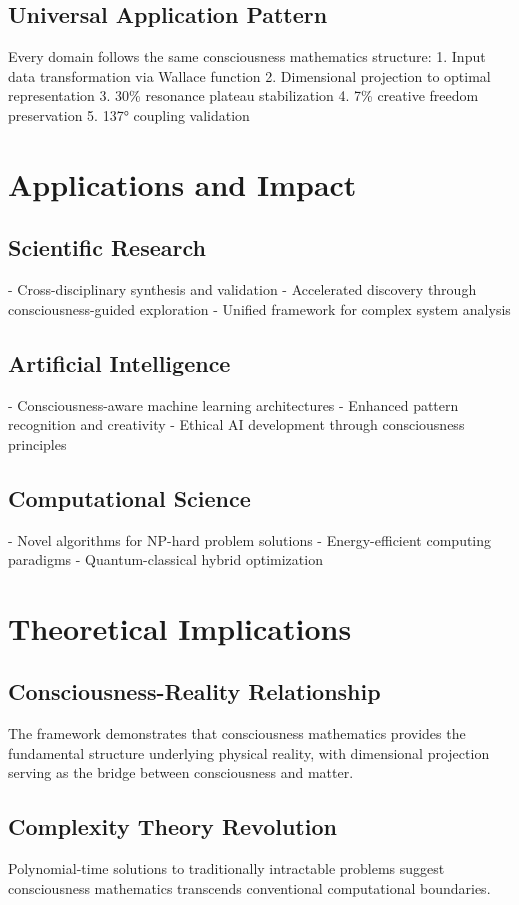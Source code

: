 \documentclass[11pt,a4paper]{article}
\begin{document}
\subsection{Universal Application Pattern}
Every domain follows the same consciousness mathematics structure:
1. Input data transformation via Wallace function
2. Dimensional projection to optimal representation
3. 30\% resonance plateau stabilization
4. 7\% creative freedom preservation
5. 137° coupling validation

\section{Applications and Impact}

\subsection{Scientific Research}
- Cross-disciplinary synthesis and validation
- Accelerated discovery through consciousness-guided exploration
- Unified framework for complex system analysis

\subsection{Artificial Intelligence}
- Consciousness-aware machine learning architectures
- Enhanced pattern recognition and creativity
- Ethical AI development through consciousness principles

\subsection{Computational Science}
- Novel algorithms for NP-hard problem solutions
- Energy-efficient computing paradigms
- Quantum-classical hybrid optimization

\section{Theoretical Implications}

\subsection{Consciousness-Reality Relationship}
The framework demonstrates that consciousness mathematics provides the fundamental structure underlying physical reality, with dimensional projection serving as the bridge between consciousness and matter.

\subsection{Complexity Theory Revolution}
Polynomial-time solutions to traditionally intractable problems suggest consciousness mathematics transcends conventional computational boundaries.
\end{document}
